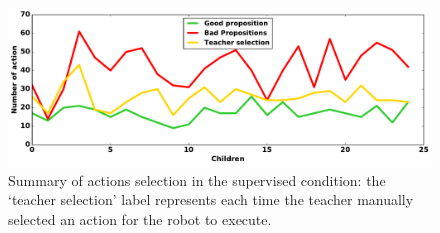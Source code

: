 
\begin{figure}[ht]
	\includegraphics[width=1\linewidth]{./summary_supervision.pdf}
	\centering
	\caption{Summary of actions selection in the supervised condition: the `teacher selection' label represents each time the teacher manually selected an action for the robot to execute.}
	\label{fig:tutoring_supervision}
\end{figure}

